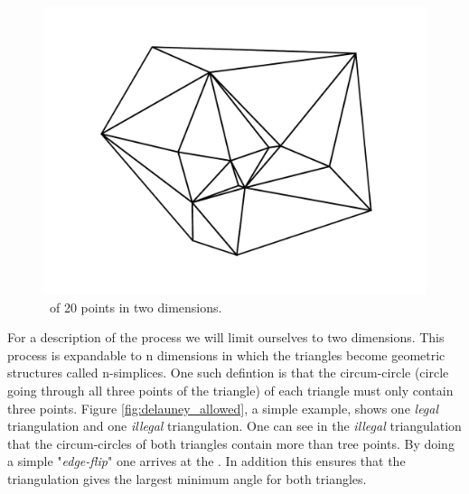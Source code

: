 \begin{figure}[tb] %
   \centering
   \includegraphics[width=\textwidth]{chapter_ndinterp/plots/simple_delauney.pdf} 
   \caption{\deltri\ of 20 points in two dimensions.}
   \label{fig:delauney_example}
\end{figure}

For a description of the process we will limit ourselves to two dimensions. This process is expandable to n dimensions in which the triangles become geometric structures called n-simplices.
One such defintion is that the circum-circle (circle going through all three points of the triangle) of each triangle must only contain three points. Figure \ref{fig:delauney_allowed}, a simple example, shows one \textit{legal} triangulation and one \textit{illegal} triangulation. One can see in the \textit{illegal} triangulation that the circum-circles of both triangles contain more than tree points. By doing a simple "\textit{edge-flip}" one arrives at the \deltri. In addition this ensures that the triangulation gives the largest minimum angle for both triangles. 


